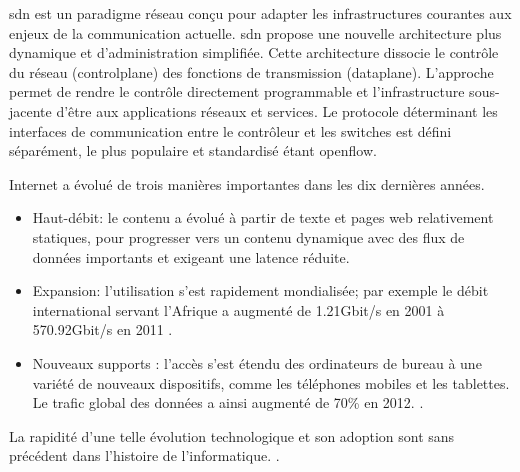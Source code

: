 \gls{sdn} est un \gls{paradigme} réseau conçu pour adapter les infrastructures courantes aux enjeux de la communication actuelle.
\gls{sdn} propose une nouvelle architecture plus dynamique et d'administration simplifiée. Cette architecture dissocie le contrôle du réseau (\gls{controlplane}) des fonctions de transmission (\gls{dataplane}). L'approche permet de rendre le contrôle directement programmable et l'infrastructure sous-jacente d'être  aux applications réseaux et services. Le protocole déterminant les interfaces de communication entre le contrôleur et les switches est défini séparément, le plus populaire et standardisé étant \gls{openflow}. \cite{OpenFlowStanford} \cite{ODCAintro} \cite{SDNNewNormONFExecutiveSummary}

\vspace*{1\baselineskip}




Internet a évolué de trois manières importantes dans les dix dernières années. %
\begin{itemize}
\itemsep0.5em 
\item Haut-débit: le contenu a évolué à partir de texte et pages web relativement statiques, pour progresser vers un contenu dynamique avec des flux de données importants et exigeant  une latence réduite. 
\item Expansion: l'utilisation s'est rapidement mondialisée; par exemple le débit international servant l'Afrique a augmenté de 1.21Gbit/s en 2001 à 570.92Gbit/s en 2011 \cite{InternetGlobalGrowthImpactDevelopingCountries}. 
\item  Nouveaux supports : l'accès s'est étendu des ordinateurs de bureau à une variété de nouveaux dispositifs, comme les téléphones mobiles et les tablettes. Le trafic global des données a ainsi augmenté de 70\% en 2012. \cite{CiscoVNI2013}. \\
\end{itemize}

\par
La rapidité d'une telle évolution technologique et son adoption sont sans précédent dans l'histoire de l'informatique. \cite{InternetGlobalGrowthImpactDevelopingCountries}.



